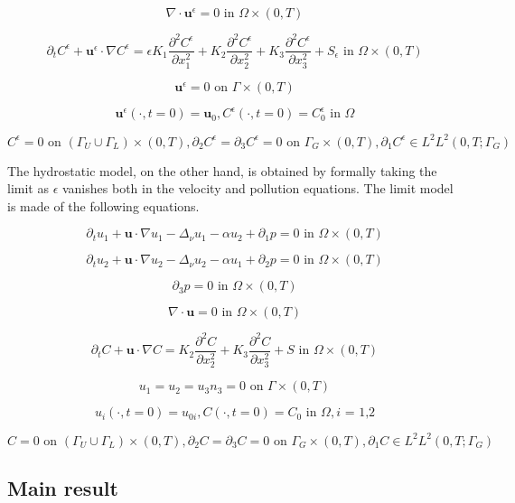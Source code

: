 \documentclass{article}
\begin{document}
    \[ \nabla \cdot \mathbf{u}^\epsilon= 0 \text{ in } \Omega \times (0,T) \]
    
    \[ \partial_t C^\epsilon + \mathbf{u}^\epsilon \cdot \nabla C^\epsilon = \epsilon K_1 \frac{\partial ^2 C^\epsilon}{\partial x_1 ^ 2} + K_2 \frac{\partial ^2 C^\epsilon}{\partial x_2 ^ 2} + K_3 \frac{\partial ^2 C^\epsilon}{\partial x_3 ^ 2} + S_\epsilon \text{ in } \Omega \times (0,T) \]
    
    \[ \mathbf{u}^\epsilon = 0 \text{ on } \Gamma \times (0,T) \] 
    
    \[ \mathbf{u}^\epsilon (\cdot, t = 0) = \mathbf{u}_0, C^\epsilon (\cdot, t=0) = C^\epsilon_0  \text{ in } \Omega \]

    \[ C^\epsilon = 0 \text{ on } ( \Gamma_U \cup \Gamma_L) \times (0,T), \partial_2 C^\epsilon = \partial_3 C^\epsilon = 0 \text{ on } \Gamma_G \times (0,T), \partial_1 C^\epsilon \in L^2 L^2 (0,T; \Gamma_G) \]

    The  hydrostatic model, on the other hand, is obtained by formally taking the limit as $\epsilon$ vanishes both in the velocity and pollution equations.
 The limit model is made of the following equations.
 
    \[ \partial_t u_1 + \mathbf{u} \cdot \nabla u_1 - \Delta_\nu u_1 -\alpha u_2 + \partial_1 p = 0 \text{ in } \Omega \times (0,T) \]
    
    \[ \partial_t u_2 + \mathbf{u} \cdot \nabla u_2 - \Delta_\nu u_2 -\alpha u_1 + \partial_2 p = 0 \text{ in } \Omega \times (0,T) \]
    
    \[ \partial_3 p = 0 \text{ in } \Omega \times (0,T) \]
    
    \[ \nabla \cdot \mathbf{u} = 0 \text{ in } \Omega \times (0,T) \]
    
    \[ \partial_t C + \mathbf{u} \cdot \nabla C = K_2 \frac{\partial ^2 C}{\partial x_2 ^ 2} + K_3 \frac{\partial ^2 C}{\partial x_3 ^ 2} + S \text{ in } \Omega \times (0,T)\]
    
    \[ u_1 = u_2 = u_3 n_3 = 0 \text{ on } \Gamma \times (0,T) \]
    
    \[ u_i (\cdot, t=0) = u_{0 i}, C (\cdot, t=0) = C_0 \text{ in } \Omega, \text{$i$ = 1,2} \]
    
    \[ C = 0 \text{ on } ( \Gamma_U \cup \Gamma_L) \times (0,T), \partial_2 C = \partial_3 C = 0 \text{ on } \Gamma_G \times (0,T), \partial_1 C \in L^2 L^2 (0,T; \Gamma_G) \]
   

\subsection{Main result}
\end{document}
